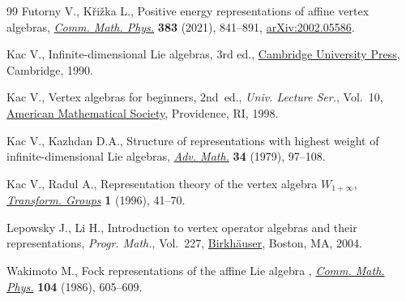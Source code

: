 \documentclass[pdftex]{sigma}
\numberwithin{equation}{section}
\theoremstyle{definition}
\newcommand{\1}{\textbf{1}}
\begin{document}
\begin{thebibliography}{99}
Futorny V., K\v{r}i\v{z}ka L., Positive energy representations of affine vertex
 algebras, \href{https://doi.org/10.1007/s00220-020-03861-7}{\textit{Comm.
 Math. Phys.}} \textbf{383} (2021), 841--891,
 \href{http://arxiv.org/abs/2002.05586}{arXiv:2002.05586}.

Kac V., Infinite-dimensional {L}ie algebras, 3rd ed.,
 \href{https://doi.org/10.1017/CBO9780511626234}{Cambridge University Press},
 Cambridge, 1990.

Kac V., Vertex algebras for beginners, 2nd~ed., \textit{Univ. Lecture Ser.}, Vol.~10, \href{https://doi.org/10.1090/ulect/010}{American Mathematical
 Society}, Providence, RI, 1998.

Kac V., Kazhdan D.A., Structure of representations with highest weight of
 infinite-dimensional {L}ie algebras,
 \href{https://doi.org/10.1016/0001-8708(79)90066-5}{\textit{Adv. Math.}}
 \textbf{34} (1979), 97--108.

Kac V., Radul A., Representation theory of the vertex algebra {$W_{1+\infty}$},
 \href{https://doi.org/10.1007/BF02587735}{\textit{Transform. Groups}}
 \textbf{1} (1996), 41--70.

Lepowsky J., Li H., Introduction to vertex operator algebras and their
 representations, \textit{Progr. Math.}, Vol.~227,
 \href{https://doi.org/10.1007/978-0-8176-8186-9}{Birkh\"{a}user}, Boston, MA,
 2004.

Wakimoto M., Fock representations of the affine {L}ie algebra
 , \href{https://doi.org/10.1007/BF01211068}{\textit{Comm.
 Math. Phys.}} \textbf{104} (1986), 605--609.

\end{thebibliography}\LastPageEnding
\end{document}
